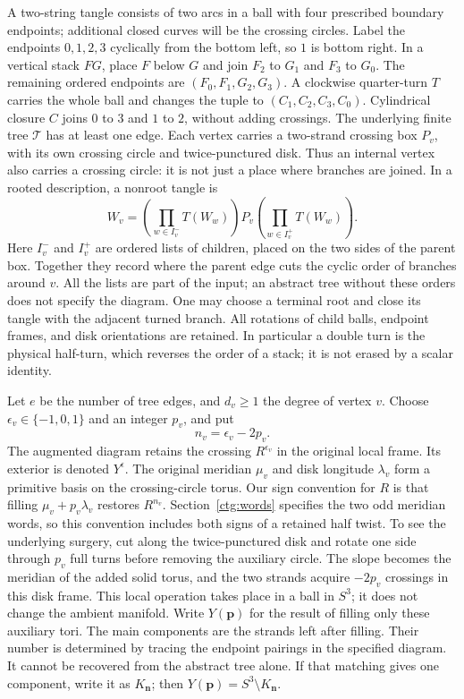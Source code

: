 \documentclass[11pt]{article}
\numberwithin{equation}{section}
\theoremstyle{definition}
\theoremstyle{remark}
\begin{document}
A two-string tangle consists of two arcs in a ball with four prescribed
boundary endpoints; additional closed curves will be the crossing
circles. Label the endpoints $0,1,2,3$ cyclically from the bottom left,
so $1$ is bottom right. In a vertical stack $FG$, place $F$ below
$G$ and join $F_2$ to $G_1$ and $F_3$ to $G_0$. The remaining
ordered endpoints are $(F_0,F_1,G_2,G_3)$. A clockwise quarter-turn
$T$ carries the whole ball and changes the tuple to
$(C_1,C_2,C_3,C_0)$. Cylindrical closure $C$ joins $0$ to $3$ and
$1$ to $2$, without adding crossings.
The underlying finite tree $\mathcal T$ has at least one edge. Each
vertex carries a two-strand crossing box $P_v$, with its own crossing
circle and twice-punctured disk. Thus an internal vertex also carries
a crossing circle: it is not just a place where branches are joined. In a rooted description, a nonroot tangle is
\begin{equation}\label{ctg:word}
 W_v=\left(\prod_{w\in I_v^-}T(W_w)\right)P_v
             \left(\prod_{w\in I_v^+}T(W_w)\right).
\end{equation}
Here $I_v^-$ and $I_v^+$ are ordered lists of children, placed on
the two sides of the parent box. Together they record where the parent
edge cuts the cyclic order of branches around $v$. All the lists are
part of the input; an abstract tree without these orders does not
specify the diagram. One may choose a terminal
root and close its tangle with the adjacent turned branch. All rotations
of child balls, endpoint frames, and disk orientations are retained.
In particular a double turn is the physical half-turn, which reverses
the order of a stack; it is not erased by a scalar identity.

Let $e$ be the number of tree edges, and $d_v\ge1$ the degree of vertex
$v$. Choose $\epsilon_v\in\{-1,0,1\}$ and an integer $p_v$, and put
\begin{equation}\label{ctg:powers}
 n_v=\epsilon_v-2p_v.
\end{equation}
The augmented diagram retains the crossing $R^{\epsilon_v}$ in the
original local frame. Its exterior is denoted $Y^\epsilon$. The original
meridian $\mu_v$ and disk longitude $\lambda_v$ form a primitive basis
on the crossing-circle torus. Our sign convention for $R$ is that
filling $\mu_v+p_v\lambda_v$ restores $R^{n_v}$. Section~\ref{ctg:words}
specifies the two odd meridian words, so this convention includes both
signs of a retained half twist. To see the underlying surgery, cut
along the twice-punctured disk and rotate one side through $p_v$ full
turns before removing the auxiliary circle. The slope becomes the
meridian of the added solid torus, and the two strands acquire
$-2p_v$ crossings in this disk frame. This local operation takes
place in a ball in $S^3$; it does not change the ambient manifold.
Write $Y(\mathbf p)$ for the result of
filling only these auxiliary tori. The main components are the strands
left after filling. Their number is determined by tracing the endpoint pairings in the
specified diagram. It cannot be recovered from the abstract tree alone. If that matching gives one component,
write it as $K_{\mathbf n}$; then $Y(\mathbf p)=S^3\setminus K_{\mathbf n}$.
\end{document}
